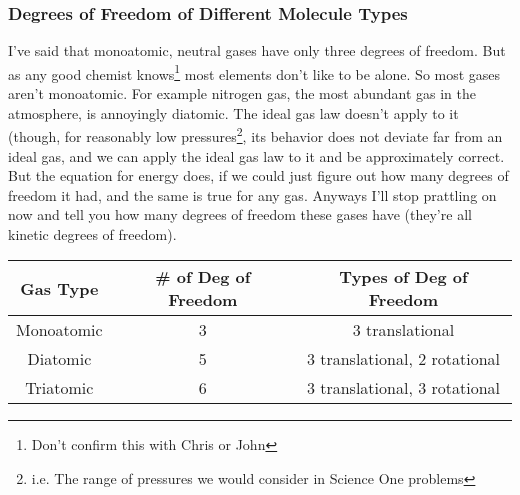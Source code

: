 \subsubsection{Degrees of Freedom of Different Molecule Types}
I've said that monoatomic, neutral gases have only three degrees of freedom. But as any good chemist knows\footnote{Don't confirm this with Chris or John} most elements don't like to be alone. So most gases aren't monoatomic. For example nitrogen gas, the most abundant gas in the atmosphere, is annoyingly diatomic. The ideal gas law doesn't apply to it (though, for reasonably low pressures\footnote{i.e. The range of pressures we would consider in Science One problems}, its behavior does not deviate far from an ideal gas, and we can apply the ideal gas law to it and be approximately correct. But the equation for energy does, if we could just figure out how many degrees of freedom it had, and the same is true for any gas. Anyways I'll stop prattling on now and tell you how many degrees of freedom these gases have (they're all kinetic degrees of freedom). \\
\newline
\begin{center}
\begin{tabular}{|c|c|c|}
    \hline
    Gas Type & \# of Deg of Freedom & Types of Deg of Freedom \\
    \hline
    Monoatomic & 3 & 3 translational \\
    \hline
    Diatomic & 5 & 3 translational, 2 rotational \\
    \hline
    Triatomic & 6 & 3 translational, 3 rotational \\
    \hline
\end{tabular}
\end{center}
